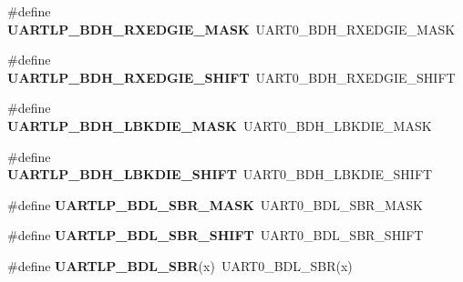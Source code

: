 \begin{DoxyCompactItemize}
\#define {\bfseries U\+A\+R\+T\+L\+P\+\_\+\+B\+D\+H\+\_\+\+R\+X\+E\+D\+G\+I\+E\+\_\+\+M\+A\+SK}~U\+A\+R\+T0\+\_\+\+B\+D\+H\+\_\+\+R\+X\+E\+D\+G\+I\+E\+\_\+\+M\+A\+SK
\item 
\mbox{\label{group___backward___compatibility___symbols_ga9128322e4fc496b2e73502b8fe09062e}} 
\#define {\bfseries U\+A\+R\+T\+L\+P\+\_\+\+B\+D\+H\+\_\+\+R\+X\+E\+D\+G\+I\+E\+\_\+\+S\+H\+I\+FT}~U\+A\+R\+T0\+\_\+\+B\+D\+H\+\_\+\+R\+X\+E\+D\+G\+I\+E\+\_\+\+S\+H\+I\+FT
\item 
\mbox{\label{group___backward___compatibility___symbols_ga8e7625a181ceadbf341a36dfcb59db33}} 
\#define {\bfseries U\+A\+R\+T\+L\+P\+\_\+\+B\+D\+H\+\_\+\+L\+B\+K\+D\+I\+E\+\_\+\+M\+A\+SK}~U\+A\+R\+T0\+\_\+\+B\+D\+H\+\_\+\+L\+B\+K\+D\+I\+E\+\_\+\+M\+A\+SK
\item 
\mbox{\label{group___backward___compatibility___symbols_gaeda76f3a18048d7d090663cff717da2c}} 
\#define {\bfseries U\+A\+R\+T\+L\+P\+\_\+\+B\+D\+H\+\_\+\+L\+B\+K\+D\+I\+E\+\_\+\+S\+H\+I\+FT}~U\+A\+R\+T0\+\_\+\+B\+D\+H\+\_\+\+L\+B\+K\+D\+I\+E\+\_\+\+S\+H\+I\+FT
\item 
\mbox{\label{group___backward___compatibility___symbols_ga3a8fa23722acd6ab86121c94976e93f7}} 
\#define {\bfseries U\+A\+R\+T\+L\+P\+\_\+\+B\+D\+L\+\_\+\+S\+B\+R\+\_\+\+M\+A\+SK}~U\+A\+R\+T0\+\_\+\+B\+D\+L\+\_\+\+S\+B\+R\+\_\+\+M\+A\+SK
\item 
\mbox{\label{group___backward___compatibility___symbols_ga8d8755af50afa7907f2c6124816ce6c0}} 
\#define {\bfseries U\+A\+R\+T\+L\+P\+\_\+\+B\+D\+L\+\_\+\+S\+B\+R\+\_\+\+S\+H\+I\+FT}~U\+A\+R\+T0\+\_\+\+B\+D\+L\+\_\+\+S\+B\+R\+\_\+\+S\+H\+I\+FT
\item 
\mbox{\label{group___backward___compatibility___symbols_gab2475ad9e99cdd6c2ac14fa469535b73}} 
\#define {\bfseries U\+A\+R\+T\+L\+P\+\_\+\+B\+D\+L\+\_\+\+S\+BR}(x)~U\+A\+R\+T0\+\_\+\+B\+D\+L\+\_\+\+S\+BR(x)
\item 
\mbox{\label{group___backward___compatibility___symbols_ga6f06cd43d0baed63132675d89a9b89ff}} 

\end{DoxyCompactItemize}
